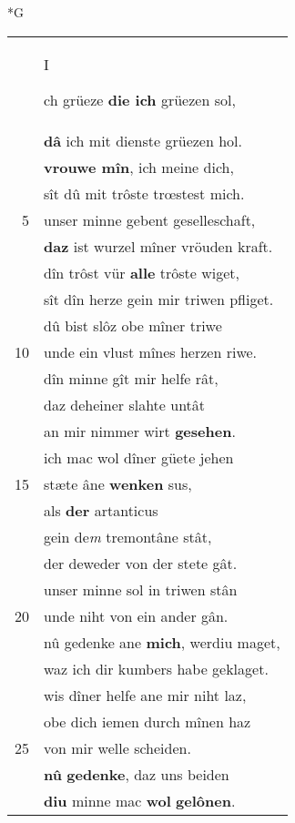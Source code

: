 \documentclass[8pt,a4paper,notitlepage]{article}
\begin{document}
\begin{table}[ht]
\begin{minipage}[t]{0.5\linewidth}
\small
\begin{center}*G
\end{center}
\begin{tabular}{rl}
 & \begin{large}I\end{large}ch grüeze \textbf{die ich} grüezen sol,\\ 
 & \textbf{dâ} ich mit dienste grüezen hol.\\ 
 & \textbf{vrouwe mîn}, ich meine dich,\\ 
 & sît dû mit trôste trœstest mich.\\ 
5 & unser minne gebent geselleschaft,\\ 
 & \textbf{daz} ist wurzel mîner vröuden kraft.\\ 
 & dîn trôst vür \textbf{alle} trôste wiget,\\ 
 & sît dîn herze gein mir triwen pfliget.\\ 
 & dû bist slôz obe mîner triwe\\ 
10 & unde ein vlust mînes herzen riwe.\\ 
 & dîn minne gît mir helfe rât,\\ 
 & daz deheiner slahte untât\\ 
 & an mir nimmer wirt \textbf{gesehen}.\\ 
 & ich mac wol dîner güete jehen\\ 
15 & stæte âne \textbf{wenken} sus,\\ 
 & als \textbf{der} artanticus\\ 
 & gein de\textit{m} tremontâne stât,\\ 
 & der deweder von der stete gât.\\ 
 & unser minne sol in triwen stân\\ 
20 & unde niht von ein ander gân.\\ 
 & nû gedenke ane \textbf{mich}, werdiu maget,\\ 
 & waz ich dir kumbers habe geklaget.\\ 
 & wis dîner helfe ane mir niht laz,\\ 
 & obe dich iemen durch mînen haz\\ 
25 & von mir welle scheiden.\\ 
 & \textbf{nû} \textbf{gedenke}, daz uns beiden\\ 
 & \textbf{diu} minne mac \textbf{wol} \textbf{gelônen}.\\ 

\end{tabular}
\end{minipage}
\end{table}
\end{document}
